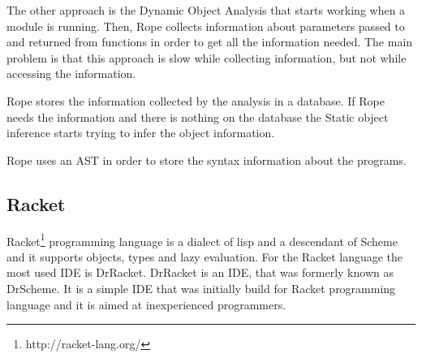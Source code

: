 The other approach is the Dynamic Object Analysis that starts working when a module is running. 
Then, Rope collects information about parameters passed to and returned from functions in order to get all the information needed. 
The main problem is that this approach is slow while collecting information, but not while accessing the information.

Rope stores the information collected by the analysis in a database. 
If Rope needs the information and there is nothing on the database the Static object inference starts trying to infer the object information.

Rope uses an AST in order to store the syntax information about the programs.









\subsection{Racket}

Racket\footnote{http://racket-lang.org/} programming language is a dialect of lisp and a descendant of Scheme and it supports objects, types and lazy evaluation.
For the Racket language the most used IDE is DrRacket. 
DrRacket is an IDE, that was formerly known as DrScheme. 
It is a simple IDE that was initially build for Racket programming language and it is aimed at inexperienced programmers.

